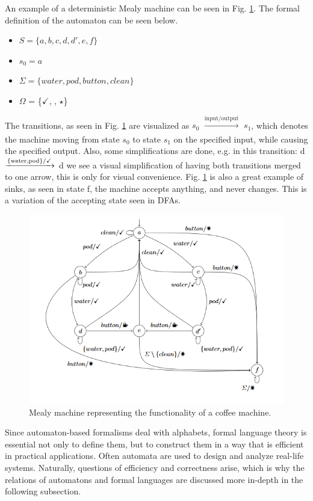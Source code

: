 \begin{example}
	\label{ex:coffeemealy}
	An example of a deterministic Mealy machine can be seen in Fig. \ref{fig:coffeemealy}. The formal definition of the automaton can be seen below.
	\begin{itemize} 
		\item $S = \{a, b, c, d, d', e, f\}$ 
		\item $s_0 = a$
		\item $\Sigma = \{water, pod, button, clean\}$
		\item $\Omega$ = \{$\checkmark$, \Coffeecup, $\star$\}
	\end{itemize}
	The transitions, as seen in Fig. \ref{fig:coffeemealy} are visualized as $s_0$ $\xrightarrow[]{\text{input/output}}$ $s_1$, which denotes the machine moving from state $s_0$ to state $s_1$ on the specified input, while causing the specified output. Also, some simplifications are done, e.g. in this transition: d $\xrightarrow[]{\text{\{water,pod\}/\checkmark}}$ d we see a visual simplification of having both transitions merged to one arrow, this is only for visual convenience. Fig. \ref{fig:coffeemealy} is also a great example of sinks, as seen in state f, the machine accepts anything, and never changes. This is a variation of the accepting state seen in DFAs.
\end{example}

\begin{figure}[H]
	\centering
	\includegraphics[width=0.7\linewidth]{content/coffeemealy}
	\caption{Mealy machine representing the functionality of a coffee machine.\cite{Steffen2011}}
	\label{fig:coffeemealy}
\end{figure}

Since automaton-based formalisms deal with alphabets, formal language theory is essential not only to define them, but to construct them in a way that is efficient in practical applications. Often automata are used to design and analyze real-life systems. Naturally, questions of efficiency and correctness arise, which is why the relations of automatons and formal languages are discussed more in-depth in the following subsection.

